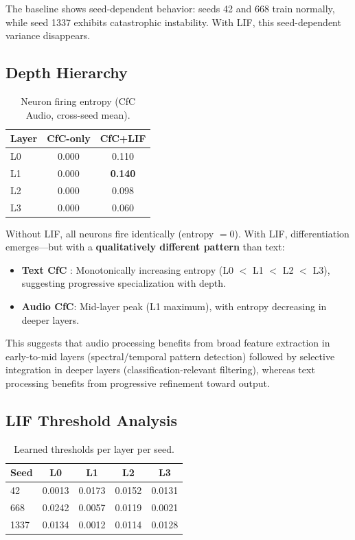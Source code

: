 \documentclass[11pt]{article}
\begin{document}
The baseline shows seed-dependent behavior: seeds 42 and 668 train normally, while seed 1337 exhibits catastrophic instability. With LIF, this seed-dependent variance disappears.

\subsection{Depth Hierarchy}

\begin{table}[h]
\centering
\caption{Neuron firing entropy (CfC Audio, cross-seed mean).}
\label{tab:entropy}
\begin{tabular}{lcc}
\toprule
\textbf{Layer} & \textbf{CfC-only} & \textbf{CfC+LIF} \\
\midrule
L0 & 0.000 & 0.110 \\
L1 & 0.000 & \textbf{0.140} \\
L2 & 0.000 & 0.098 \\
L3 & 0.000 & 0.060 \\
\bottomrule
\end{tabular}
\end{table}

Without LIF, all neurons fire identically (entropy $= 0$). With LIF, differentiation emerges---but with a \textbf{qualitatively different pattern} than text:
\begin{itemize}
    \item \textbf{Text CfC} \cite{tsubasa2026lif}: Monotonically increasing entropy (L0 $<$ L1 $<$ L2 $<$ L3), suggesting progressive specialization with depth.
    \item \textbf{Audio CfC}: Mid-layer peak (L1 maximum), with entropy decreasing in deeper layers.
\end{itemize}

This suggests that audio processing benefits from broad feature extraction in early-to-mid layers (spectral/temporal pattern detection) followed by selective integration in deeper layers (classification-relevant filtering), whereas text processing benefits from progressive refinement toward output.

\subsection{LIF Threshold Analysis}

\begin{table}[h]
\centering
\caption{Learned thresholds per layer per seed.}
\label{tab:thresholds}
\begin{tabular}{lcccc}
\toprule
\textbf{Seed} & \textbf{L0} & \textbf{L1} & \textbf{L2} & \textbf{L3} \\
\midrule
42 & 0.0013 & 0.0173 & 0.0152 & 0.0131 \\
668 & 0.0242 & 0.0057 & 0.0119 & 0.0021 \\
1337 & 0.0134 & 0.0012 & 0.0114 & 0.0128 \\
\bottomrule
\end{tabular}
\end{table}
\end{document}
